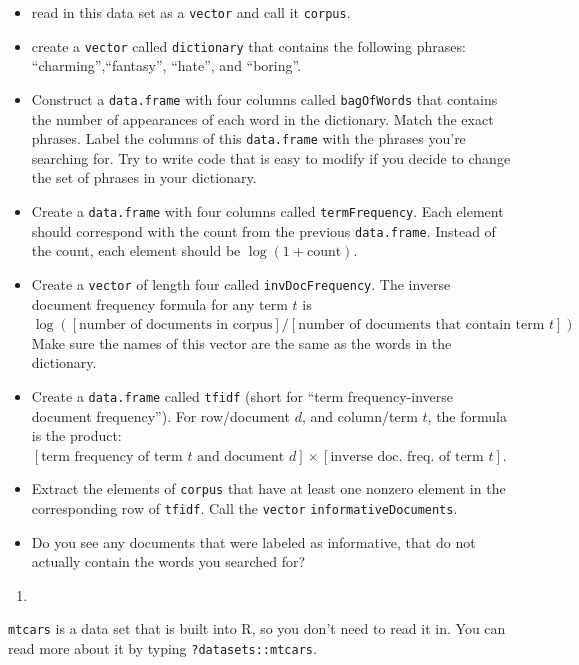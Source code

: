 \documentclass[
  12pt,
  krantz2]{krantz}
\providecommand{\tightlist}{%
  \setlength{\itemsep}{0pt}\setlength{\parskip}{0pt}}
\begin{document}
\begin{itemize}
\tightlist
\item
  read in this data set as a \texttt{vector} and call it \texttt{corpus}.
\item
  create a \texttt{vector} called \texttt{dictionary} that contains the following phrases: ``charming'',``fantasy'', ``hate'', and ``boring''.
\item
  Construct a \texttt{data.frame} with four columns called \texttt{bagOfWords} that contains the number of appearances of each word in the dictionary. Match the exact phrases. Label the columns of this \texttt{data.frame} with the phrases you're searching for. Try to write code that is easy to modify if you decide to change the set of phrases in your dictionary.
\item
  Create a \texttt{data.frame} with four columns called \texttt{termFrequency}. Each element should correspond with the count from the previous \texttt{data.frame}. Instead of the count, each element should be \(\log(1 + \text{count})\).
\item
  Create a \texttt{vector} of length four called \texttt{invDocFrequency}. The inverse document frequency formula for any term \(t\) is \(\log([\text{number of documents in corpus}] / [\text{number of documents that contain term } t])\) Make sure the names of this vector are the same as the words in the dictionary.
\item
  Create a \texttt{data.frame} called \texttt{tfidf} (short for ``term frequency-inverse document frequency''). For row/document \(d\), and column/term \(t\), the formula is the product: \([\text{term frequency of term } t \text{ and document } d ] \times [\text{inverse doc. freq. of term } t]\).
\item
  Extract the elements of \texttt{corpus} that have at least one nonzero element in the corresponding row of \texttt{tfidf}. Call the \texttt{vector} \texttt{informativeDocuments}.
\item
  Do you see any documents that were labeled as informative, that do not actually contain the words you searched for?
\end{itemize}

\begin{enumerate}
\def\labelenumi{\arabic{enumi}.}
\setcounter{enumi}{1}
\tightlist
\item
\end{enumerate}

\texttt{mtcars} is a data set that is built into R, so you don't need to read it in. You can read more about it by typing \texttt{?datasets::mtcars}.
\end{document}

